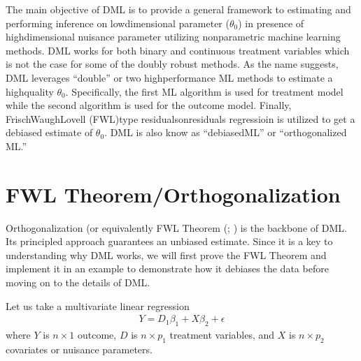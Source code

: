 \documentclass[letterpaper,10pt,english]{jupyterBook}
\begin{document}
\sphinxAtStartPar
The main objective of DML is to provide a general framework to estimating and performing inference on low\sphinxhyphen{}dimensional parameter (\( \theta_0\)) in presence of high\sphinxhyphen{}dimensional nuisance parameter utilizing nonparametric machine learning methods. DML works for both binary and continuous treatment variables which is not the case for some of the doubly robust methods. As the name suggests, DML leverages “double” or two high\sphinxhyphen{}performance ML methods to estimate a high\sphinxhyphen{}quality \(\theta_0\). Specifically, the first ML algorithm is used for treatment model while the second algorithm is used for the outcome model. Finally, Frisch\sphinxhyphen{}Waugh\sphinxhyphen{}Lovell (FWL)\sphinxhyphen{}type residuals\sphinxhyphen{}on\sphinxhyphen{}residuals regressioin is utilized to get a de\sphinxhyphen{}biased estimate of \(\theta_0\). DML is also know as “debiased\sphinxhyphen{}ML” or “orthogonalized ML.”


\section{FWL Theorem/Orthogonalization}
\label{\detokenize{orthogonal_DML:fwl-theorem-orthogonalization}}
\sphinxAtStartPar
Orthogonalization (or equivalently FWL Theorem (; ) is the backbone of DML. Its principled approach guarantees an unbiased estimate. Since it is a key to understanding why DML works, we will first prove the FWL Theorem and implement it in an example to demonstrate how it debiases the data before moving on to the details of DML.

\sphinxAtStartPar
Let us take a multivariate linear regression
\begin{equation*}
\begin{split} Y = D_1\beta_1 + X\beta_2 + \epsilon \end{split}
\end{equation*}
\sphinxAtStartPar
where \(Y\) is \( n \times 1\) outcome, \(D\) is \(n \times p_1\) treatment variables, and \(X\) is \(n \times p_2\) covariates or nuisance parameters.
\end{document}
